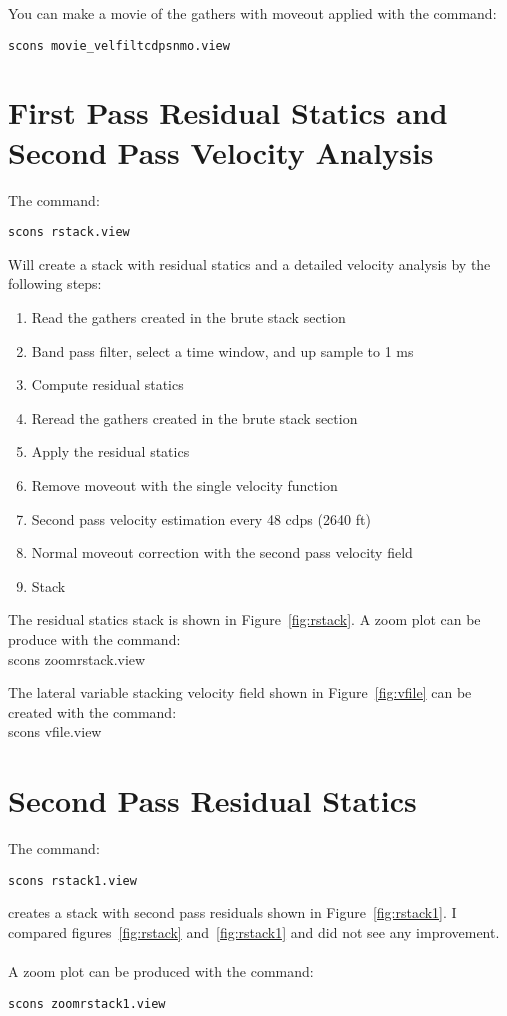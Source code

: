 You can make a movie of the gathers with moveout applied with the
command: 
\begin{verbatim}
scons movie_velfiltcdpsnmo.view
\end{verbatim}


\section{First Pass Residual Statics and Second Pass Velocity Analysis}
The command:
\begin{verbatim}
scons rstack.view
\end{verbatim}
Will create a stack with residual statics and a detailed velocity analysis 
by the following steps:
\begin{enumerate}
\item Read the gathers created in the brute stack section
\item Band pass filter, select a time window, and up sample to 1 ms
\item Compute residual statics
\item Reread the gathers created in the brute stack section
\item Apply the residual statics
\item Remove moveout with the single velocity function 
\item Second pass velocity estimation every 48 cdps (2640 ft)
\item Normal moveout correction with the second pass velocity field 
\item Stack
\end{enumerate}

The residual statics stack is shown in Figure~\ref{fig:rstack}.  A zoom 
plot can be produce with the command:\\
scons zoomrstack.view


The lateral variable stacking velocity field shown in Figure~\ref{fig:vfile} 
can be created with the command:\\
scons vfile.view


\section{Second Pass Residual Statics}
The command:
\begin{verbatim}
scons rstack1.view
\end{verbatim}
creates a stack with second pass residuals shown in Figure~\ref{fig:rstack1}.  
I compared figures~\ref{fig:rstack} and~\ref{fig:rstack1} and did not see 
any improvement.\\
\\  
A zoom plot can be produced with the command:
\begin{verbatim}
scons zoomrstack1.view
\end{verbatim}

